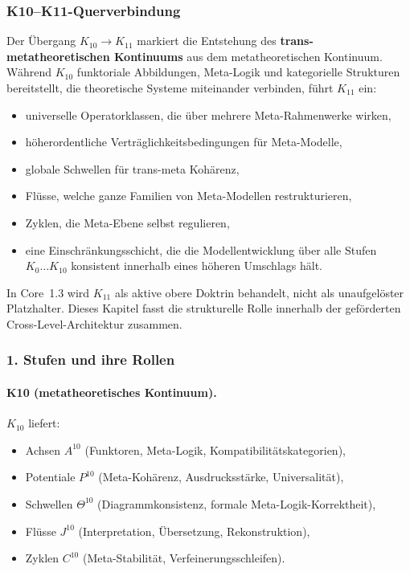 
\subsubsection{K10–K11-Querverbindung}
\label{sec:crossk-k10-k11}

Der Übergang $K_{10} \rightarrow K_{11}$ markiert die Entstehung des
\textbf{trans-metatheoretischen Kontinuums} aus dem metatheoretischen
Kontinuum. Während $K_{10}$ funktoriale Abbildungen, Meta-Logik und
kategorielle Strukturen bereitstellt, die theoretische Systeme miteinander verbinden,
führt $K_{11}$ ein:
\begin{itemize}
  \item universelle Operatorklassen, die über mehrere Meta-Rahmenwerke wirken,
  \item höherordentliche Verträglichkeitsbedingungen für Meta-Modelle,
  \item globale Schwellen für trans-meta Kohärenz,
  \item Flüsse, welche ganze Familien von Meta-Modellen restrukturieren,
  \item Zyklen, die Meta-Ebene selbst regulieren,
  \item eine Einschränkungsschicht, die die Modellentwicklung über alle Stufen
        $K_0\dots K_{10}$ konsistent innerhalb eines höheren Umschlags hält.
\end{itemize}

In Core~1.3 wird $K_{11}$ als aktive obere Doktrin behandelt, nicht als
unaufgelöster Platzhalter. Dieses Kapitel fasst die strukturelle Rolle innerhalb
der geförderten Cross-Level-Architektur zusammen.

\subsubsection{1. Stufen und ihre Rollen}

\paragraph{K10 (metatheoretisches Kontinuum).}
$K_{10}$ liefert:
\begin{itemize}
  \item Achsen $A^{10}$ (Funktoren, Meta-Logik, Kompatibilitätskategorien),
  \item Potentiale $P^{10}$ (Meta-Kohärenz, Ausdrucksstärke, Universalität),
  \item Schwellen $\Theta^{10}$ (Diagrammkonsistenz,
        formale Meta-Logik-Korrektheit),
  \item Flüsse $J^{10}$ (Interpretation, Übersetzung, Rekonstruktion),
  \item Zyklen $C^{10}$ (Meta-Stabilität, Verfeinerungsschleifen).
\end{itemize}

